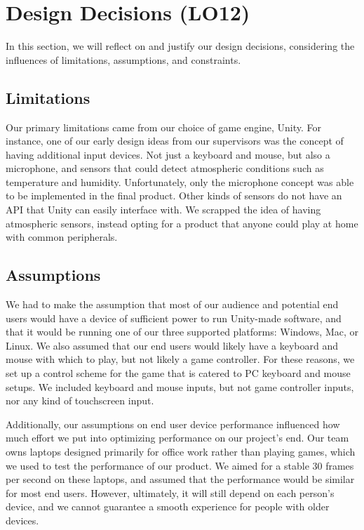 \documentclass{article}
\begin{document}
\section{Design Decisions (LO12)}

In this section, we will reflect on and justify our design decisions, considering 
the influences of limitations, assumptions, and constraints.

\subsection{Limitations}

Our primary limitations came from our choice of game engine, Unity. For instance, 
one of our early design ideas from our supervisors was the concept of having additional 
input devices. Not just a keyboard and mouse, but also a microphone, and sensors that 
could detect atmospheric conditions such as temperature and humidity. Unfortunately, 
only the microphone concept was able to be implemented in the final product. Other kinds 
of sensors do not have an API that Unity can easily interface with. We scrapped the idea 
of having atmospheric sensors, instead opting for a product that anyone could play at 
home with common peripherals.

\subsection{Assumptions}

We had to make the assumption that most of our audience and potential end users would 
have a device of sufficient power to run Unity-made software, and that it would be running one 
of our three supported platforms: Windows, Mac, or Linux. We also assumed that our end users 
would likely have a keyboard and mouse with which to play, but not likely a game controller.
For these reasons, we set up a control scheme for the game that is catered to PC keyboard 
and mouse setups. We included keyboard and mouse inputs, but not game controller inputs, nor
any kind of touchscreen input.

Additionally, our assumptions on end user device performance influenced how much effort we 
put into optimizing performance on our project's end. Our team owns laptops designed primarily 
for office work rather than playing games, which we used to test the performance of our product.
We aimed for a stable 30 frames per second on these laptops, and assumed that the performance 
would be similar for most end users. However, ultimately, it will still depend on each person's 
device, and we cannot guarantee a smooth experience for people with older devices.
\end{document}
